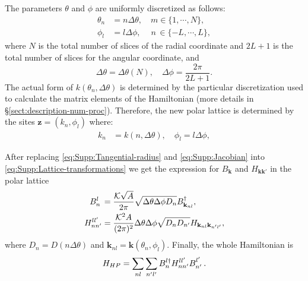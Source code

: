 \documentclass[english,aps,prd,nofootinbib,twocolumn]{revtex4-1}
\begin{document}
The parameters $\theta$ and $\phi$ are uniformly discretized as follows:
\begin{equation}
\label{eq:Supp:Discretization-of-angles}
\begin{split}
\theta_{n} &= n \Delta\theta, \quad m \in \{1,\cdots ,N\}, \\
  \phi_{l} &= l \Delta\phi  , \quad \:n \,\in \{-L,\cdots ,L\},
\end{split}
\end{equation}
where $N$ is the total number of slices of the radial coordinate and $2L+1$ is the total number of slices for the angular coordinate, and
\begin{equation}
\label{eq:Discrete-angle-units}
\Delta \theta = \Delta \theta(N), 
\quad
\Delta \phi = \frac{2\pi}{2L + 1}.
\end{equation}
The actual form of $k(\theta_{n},\Delta \theta)$ is determined by the particular discretization used to calculate the matrix elements of the Hamiltonian (more details in \S \ref{sect:description-num-proc}).
Therefore, the new polar lattice is determined by the sites $\mathbf{z}=(k_{n},\phi_{l})$ where:
\begin{equation}
\label{eq:Tangential-radius}
\begin{split}
    k_{n} &= k(n,\Delta \theta),
    \quad \phi_{l} = l\Delta \phi,
\end{split}
\end{equation}


After replacing \eqref{eq:Supp:Tangential-radius} and  \eqref{eq:Supp:Jacobian} into \eqref{eq:Supp:Lattice-transformations} we get the expression for $B_{\mathbf{k}}$ and $H_{\mathbf{k k'}}$ in the polar lattice
\begin{equation}
\label{eq:Supp:Lattice-transformations-1}
\begin{split}
B_{n}^{l\textcolor{white}{\dagger}} &=
\frac{\mathcal{K}\sqrt{A}}{2\pi}
\sqrt{\Delta \theta \Delta \phi D_{n} }
B_{\mathbf{k}_{nl}}^{\textcolor{black}{\dagger}},  \\
H_{nn'}^{ll'} &= 
\frac{\mathcal{K}^{2}A}{(2\pi)^{2}}
\Delta \theta \Delta \phi 
\sqrt{D_{n}D_{n'}}
H_{\mathbf{k}_{nl}\mathbf{k}_{n'l'}},
\end{split}
\end{equation}
where $D_{n}=D(n\Delta \theta)$ and $\mathbf{k}_{nl}=\mathbf{k}(\theta_{n},\phi_{l})$. Finally, the whole Hamiltonian is
\begin{equation}
H_{HP} = \sum_{nl}\sum_{n'l'}
B_{n }^{l \textcolor{black}{\dagger}}
H_{nn'}^{ll'}
B_{n'}^{l'\textcolor{white}{\dagger}}.
\end{equation}
\end{document}
